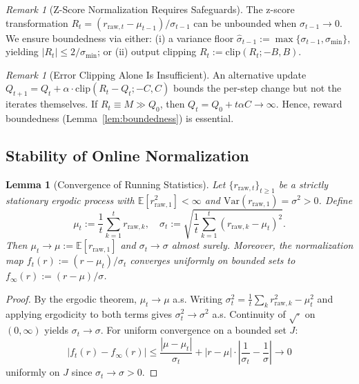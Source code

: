 \documentclass{article} %
\newtheorem{lemma}[theorem]{Lemma}
\theoremstyle{definition}
\theoremstyle{remark}
\newtheorem{remark}[theorem]{Remark}
\begin{document}
  \begin{remark}[Z-Score Normalization Requires Safeguards]
  \label{rem:zscore}
  The z-score transformation $R_t = (r_{\text{raw},t} - \mu_{t-1}) / \sigma_{t-1}$ can be unbounded when $\sigma_{t-1} \to 0$. We ensure boundedness via either: (i) a variance floor $\hat{\sigma}_{t-1} := \max\{\sigma_{t-1}, \sigma_{\min}\}$, yielding $|R_t| \le 2/\sigma_{\min}$; or (ii) output clipping $R_t := \mathrm{clip}(R_t; -B, B)$.
  \end{remark}

  \begin{remark}[Error Clipping Alone Is Insufficient]
  \label{rem:td_clip}
  An alternative update $Q_{t+1} = Q_t + \alpha \cdot \mathrm{clip}(R_t - Q_t; -C, C)$ bounds the per-step change but not the iterates themselves. If $R_t \equiv M \gg Q_0$, then $Q_t = Q_0 + t\alpha C \to \infty$. Hence, reward boundedness (Lemma~\ref{lem:boundedness}) is essential.
  \end{remark}

  \subsection{Stability of Online Normalization}

  \begin{lemma}[Convergence of Running Statistics]
  \label{lem:popart}
  Let $\{r_{\text{raw},t}\}_{t \ge 1}$ be a strictly stationary ergodic process with $\mathbb{E}[r_{\text{raw},1}^2] < \infty$ and $\mathrm{Var}(r_{\text{raw},1}) = \sigma^2 > 0$. Define
  \begin{equation}
  \mu_t := \frac{1}{t} \sum_{k=1}^{t} r_{\text{raw},k}, \quad \sigma_t := \sqrt{\frac{1}{t} \sum_{k=1}^{t} (r_{\text{raw},k} - \mu_t)^2}.
  \end{equation}
  Then $\mu_t \to \mu := \mathbb{E}[r_{\text{raw},1}]$ and $\sigma_t \to \sigma$ almost surely. Moreover, the normalization map $f_t(r) := (r - \mu_t)/\sigma_t$ converges uniformly on bounded sets to $f_\infty(r) := (r - \mu)/\sigma$.
  \end{lemma}

  \begin{proof}
  By the ergodic theorem, $\mu_t \to \mu$ a.s. Writing $\sigma_t^2 = \frac{1}{t}\sum_k r_{\text{raw},k}^2 - \mu_t^2$ and applying ergodicity to both terms gives $\sigma_t^2 \to \sigma^2$ a.s. Continuity of $\sqrt{\cdot}$ on $(0,\infty)$ yields $\sigma_t \to \sigma$. For uniform convergence on a bounded set $J$:
  \[
  |f_t(r) - f_\infty(r)| \le \frac{|\mu - \mu_t|}{\sigma_t} + |r - \mu| \cdot \left|\frac{1}{\sigma_t} - \frac{1}{\sigma}\right| \to 0
  \]
  uniformly on $J$ since $\sigma_t \to \sigma > 0$.
  \end{proof}
\end{document}
